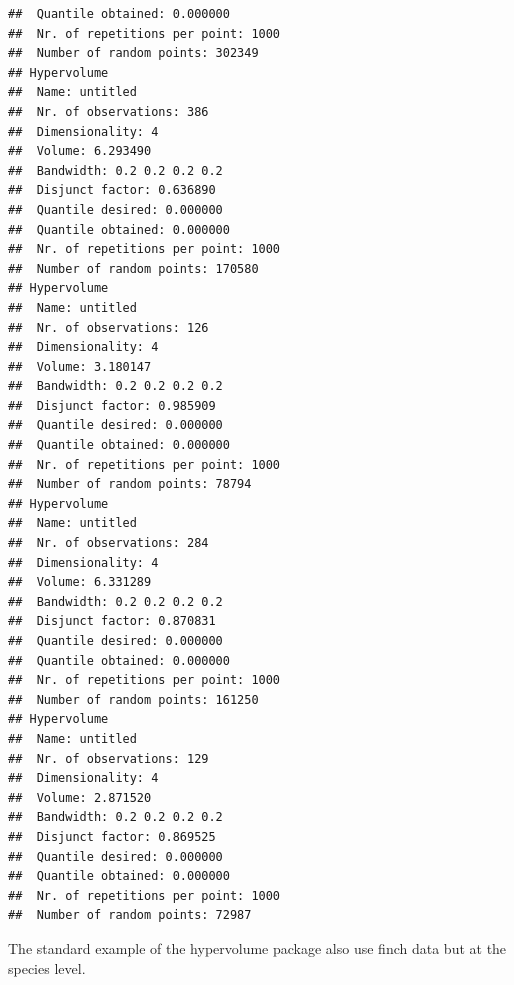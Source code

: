\documentclass[12pt]{article}\usepackage[]{graphicx}\usepackage[]{color}
\makeatletter
\newenvironment{kframe}{%
 \def\at@end@of@kframe{}%
 \ifinner\ifhmode%
  \def\at@end@of@kframe{\end{minipage}}%
  \begin{minipage}{\columnwidth}%
 \fi\fi%
 \def\FrameCommand##1{\hskip\@totalleftmargin \hskip-\fboxsep
 \colorbox{shadecolor}{##1}\hskip-\fboxsep
     \hskip-\linewidth \hskip-\@totalleftmargin \hskip\columnwidth}%
 \MakeFramed {\advance\hsize-\width
   \@totalleftmargin\z@ \linewidth\hsize
   \@setminipage}}%
 {\par\unskip\endMakeFramed%
 \at@end@of@kframe}
\newenvironment{knitrout}{}{} %
\makeatother
\begin{document}
\begin{knitrout}
\begin{kframe}
\begin{verbatim}
## 	Quantile obtained: 0.000000
## 	Nr. of repetitions per point: 1000
## 	Number of random points: 302349
## Hypervolume
## 	Name: untitled
## 	Nr. of observations: 386
## 	Dimensionality: 4
## 	Volume: 6.293490
## 	Bandwidth: 0.2 0.2 0.2 0.2
## 	Disjunct factor: 0.636890
## 	Quantile desired: 0.000000
## 	Quantile obtained: 0.000000
## 	Nr. of repetitions per point: 1000
## 	Number of random points: 170580
## Hypervolume
## 	Name: untitled
## 	Nr. of observations: 126
## 	Dimensionality: 4
## 	Volume: 3.180147
## 	Bandwidth: 0.2 0.2 0.2 0.2
## 	Disjunct factor: 0.985909
## 	Quantile desired: 0.000000
## 	Quantile obtained: 0.000000
## 	Nr. of repetitions per point: 1000
## 	Number of random points: 78794
## Hypervolume
## 	Name: untitled
## 	Nr. of observations: 284
## 	Dimensionality: 4
## 	Volume: 6.331289
## 	Bandwidth: 0.2 0.2 0.2 0.2
## 	Disjunct factor: 0.870831
## 	Quantile desired: 0.000000
## 	Quantile obtained: 0.000000
## 	Nr. of repetitions per point: 1000
## 	Number of random points: 161250
## Hypervolume
## 	Name: untitled
## 	Nr. of observations: 129
## 	Dimensionality: 4
## 	Volume: 2.871520
## 	Bandwidth: 0.2 0.2 0.2 0.2
## 	Disjunct factor: 0.869525
## 	Quantile desired: 0.000000
## 	Quantile obtained: 0.000000
## 	Nr. of repetitions per point: 1000
## 	Number of random points: 72987
\end{verbatim}
\end{kframe}
\end{knitrout}

The standard example of the hypervolume package also use finch data but at the species level.
\end{document}
